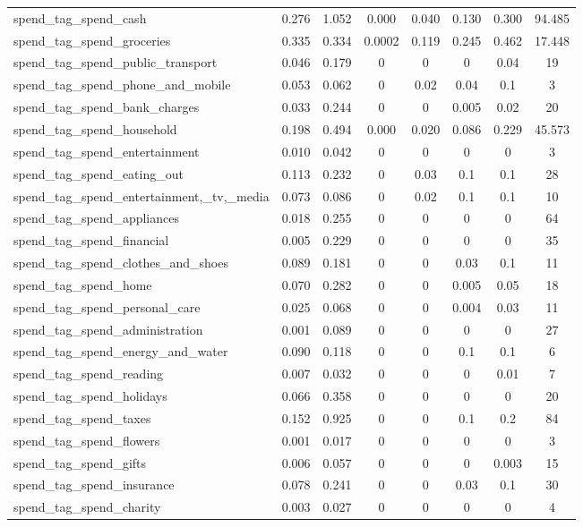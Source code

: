 \begin{table}[!htbp]
\begin{tabular}{@{\extracolsep{5pt}}lccccccc}
spend\_tag\_spend\_cash & 0.276 & 1.052 & 0.000 & 0.040 & 0.130 & 0.300 & 94.485 \\ 
spend\_tag\_spend\_groceries & 0.335 & 0.334 & 0.0002 & 0.119 & 0.245 & 0.462 & 17.448 \\ 
spend\_tag\_spend\_public\_transport & 0.046 & 0.179 & 0 & 0 & 0 & 0.04 & 19 \\ 
spend\_tag\_spend\_phone\_and\_mobile & 0.053 & 0.062 & 0 & 0.02 & 0.04 & 0.1 & 3 \\ 
spend\_tag\_spend\_bank\_charges & 0.033 & 0.244 & 0 & 0 & 0.005 & 0.02 & 20 \\ 
spend\_tag\_spend\_household & 0.198 & 0.494 & 0.000 & 0.020 & 0.086 & 0.229 & 45.573 \\ 
spend\_tag\_spend\_entertainment & 0.010 & 0.042 & 0 & 0 & 0 & 0 & 3 \\ 
spend\_tag\_spend\_eating\_out & 0.113 & 0.232 & 0 & 0.03 & 0.1 & 0.1 & 28 \\ 
spend\_tag\_spend\_entertainment,\_tv,\_media & 0.073 & 0.086 & 0 & 0.02 & 0.1 & 0.1 & 10 \\ 
spend\_tag\_spend\_appliances & 0.018 & 0.255 & 0 & 0 & 0 & 0 & 64 \\ 
spend\_tag\_spend\_financial & 0.005 & 0.229 & 0 & 0 & 0 & 0 & 35 \\ 
spend\_tag\_spend\_clothes\_and\_shoes & 0.089 & 0.181 & 0 & 0 & 0.03 & 0.1 & 11 \\ 
spend\_tag\_spend\_home & 0.070 & 0.282 & 0 & 0 & 0.005 & 0.05 & 18 \\ 
spend\_tag\_spend\_personal\_care & 0.025 & 0.068 & 0 & 0 & 0.004 & 0.03 & 11 \\ 
spend\_tag\_spend\_administration & 0.001 & 0.089 & 0 & 0 & 0 & 0 & 27 \\ 
spend\_tag\_spend\_energy\_and\_water & 0.090 & 0.118 & 0 & 0 & 0.1 & 0.1 & 6 \\ 
spend\_tag\_spend\_reading & 0.007 & 0.032 & 0 & 0 & 0 & 0.01 & 7 \\ 
spend\_tag\_spend\_holidays & 0.066 & 0.358 & 0 & 0 & 0 & 0 & 20 \\ 
spend\_tag\_spend\_taxes & 0.152 & 0.925 & 0 & 0 & 0.1 & 0.2 & 84 \\ 
spend\_tag\_spend\_flowers & 0.001 & 0.017 & 0 & 0 & 0 & 0 & 3 \\ 
spend\_tag\_spend\_gifts & 0.006 & 0.057 & 0 & 0 & 0 & 0.003 & 15 \\ 
spend\_tag\_spend\_insurance & 0.078 & 0.241 & 0 & 0 & 0.03 & 0.1 & 30 \\ 
spend\_tag\_spend\_charity & 0.003 & 0.027 & 0 & 0 & 0 & 0 & 4 \\ 

\end{tabular}
\end{table}
